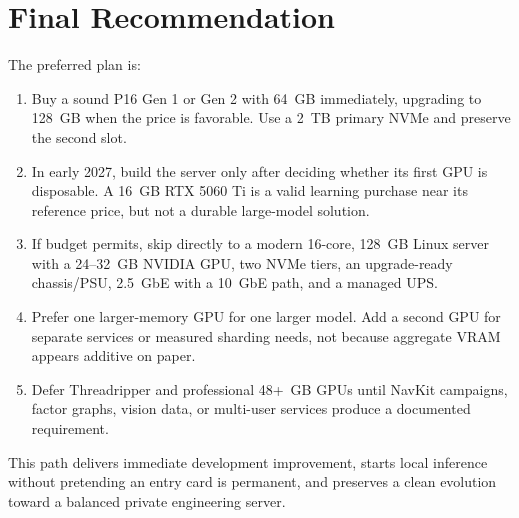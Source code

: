 \documentclass[11pt]{article}
\begin{document}
\section{Final Recommendation}

The preferred plan is:

\begin{enumerate}
  \item Buy a sound P16 Gen 1 or Gen 2 with 64~GB immediately, upgrading to
        128~GB when the price is favorable. Use a 2~TB primary NVMe and preserve
        the second slot.
  \item In early 2027, build the server only after deciding whether its first
        GPU is disposable. A 16~GB RTX 5060 Ti is a valid learning purchase near
        its reference price, but not a durable large-model solution.
  \item If budget permits, skip directly to a modern 16-core, 128~GB Linux
        server with a 24--32~GB NVIDIA GPU, two NVMe tiers, an upgrade-ready
        chassis/PSU, 2.5~GbE with a 10~GbE path, and a managed UPS.
  \item Prefer one larger-memory GPU for one larger model. Add a second GPU for
        separate services or measured sharding needs, not because aggregate
        VRAM appears additive on paper.
  \item Defer Threadripper and professional 48+~GB GPUs until NavKit campaigns,
        factor graphs, vision data, or multi-user services produce a documented
        requirement.
\end{enumerate}

This path delivers immediate development improvement, starts local inference
without pretending an entry card is permanent, and preserves a clean evolution
toward a balanced private engineering server.

\printbibliography
\end{document}
